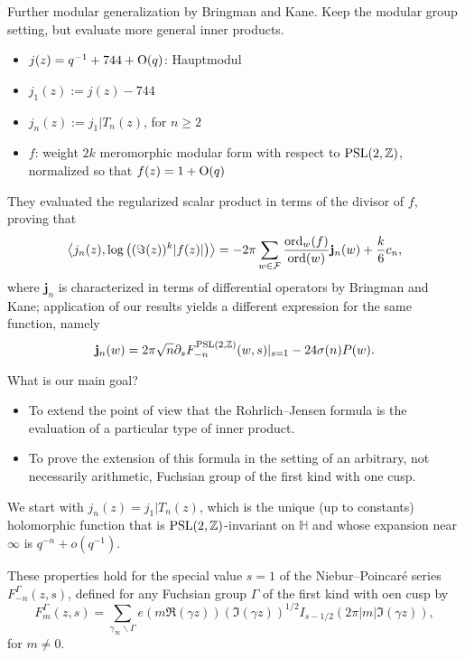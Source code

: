 \documentclass[reqno]{amsart} 
\begin{document}
Further modular generalization by Bringman and Kane.  Keep the modular group setting, but evaluate more general inner products.
\begin{itemize}
\item $j(z) = q^{-1} + 744 + \operatorname{O}(q)$: Hauptmodul
\item $j_1(z) := j(z) - 744$
\item $j_n(z) := j_1 | T_n(z)$, for $n \geq 2$
\item $f$: weight $2 k$ meromorphic modular form with respect to $\operatorname{PSL}(2, \mathbb{Z})$, normalized so that $f(z) = 1 + \operatorname{O}(q)$
\end{itemize}
They evaluated the regularized scalar product in terms of the divisor of $f$, proving that
\begin{equation*}
  \left\langle j_n(z),
    \log \left((\Im(z))^k \lvert f(z) \rvert \right)\right\rangle
  = - 2 \pi \sum_{w \in \mathcal{F}}
  \frac{\operatorname{ord}_w(f)}{\operatorname{ord}(w)}
  \mathbf{j}_n(w)
  + \frac{k}{6} c_n,
\end{equation*}
where $\mathbf{j}_n$ is characterized in terms of differential operators by Bringman and Kane; application of our results yields a different expression for the same function, namely
\begin{equation*}
  \mathbf{j}_n(w) = 2 \pi \sqrt{n} \partial_s F_{- n}^{\operatorname{PSL}(2, \mathbb{Z})}(w, s) |_{s=1}
  - 24 \sigma(n) P(w).
\end{equation*}

What is our main goal?
\begin{itemize}
\item To extend the point of view that the Rohrlich--Jensen formula is the evaluation of a particular type of inner product.
\item To prove the extension of this formula in the setting of an arbitrary, not necessarily arithmetic, Fuchsian group of the first kind with one cusp.
\end{itemize}

We start with $j_n(z) = j_1 | T_n(z)$, which is the unique (up to constants) holomorphic function that is $\operatorname{PSL}(2,\mathbb{Z})$-invariant on $\mathbb{H}$ and whose expansion near $\infty$ is $q^{- n} + o(q^{-1})$.

These properties hold for the special value $s = 1$ of the Niebur--Poincar{\'e} series $F_{- n}^{\Gamma}(z, s)$, defined for any Fuchsian group $\Gamma$ of the first kind with oen cusp by
\begin{equation*}
  F_m^\Gamma(z, s)
  = \sum_{\gamma_\infty \backslash \Gamma}
  e \left( m \Re(\gamma z) \right) \left( \Im(\gamma z) \right)^{1/2} I_{s - 1/2} \left( 2 \pi \lvert m \rvert \Im(\gamma z) \right),
\end{equation*}
for $m \neq 0$.
\end{document}

